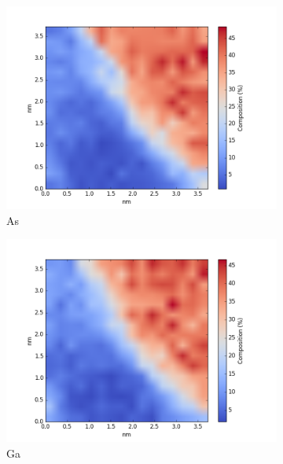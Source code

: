 \begin{figure}
	\centering
	\begin{subfigure}{0.5\linewidth}
		\includegraphics[width=\linewidth]{fig/q/D_heated/_binned_As_zetaAbs}
		\caption{As}
		\label{fig:Das}
	\end{subfigure}%
	\hfill
	\begin{subfigure}{0.5\linewidth}
		\includegraphics[width=\linewidth]{fig/q/D_heated/_binned_Ga_zetaAbs}
		\caption{Ga}
		\label{fig:Dga}
	\end{subfigure}
	\centering
	\begin{subfigure}{0.5\textwidth}

\end{subfigure}
\end{figure}
